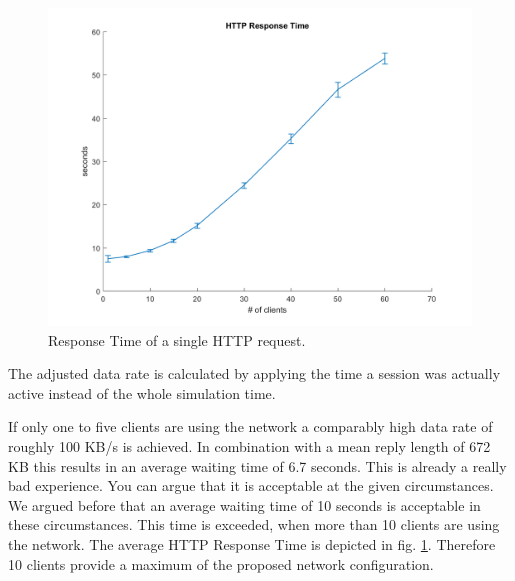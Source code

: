\documentclass[
10pt, %
a4paper, %
oneside, %
headinclude,footinclude, %
BCOR5mm, %
]{scrartcl}
\begin{document}
\begin{figure}[!ht]
  \centering
  \includegraphics[width=\textwidth]{Figures/cctv/HTTP_Response_Time.png}
  \caption{Response Time of a single HTTP request.} \label{fig:cctv_http_request_time}
\end{figure}

The adjusted data rate is calculated by applying the time a session was actually active instead of the whole simulation time. 

If only one to five clients are using the network a comparably high data rate of roughly 100 KB/s is achieved. In combination with a mean reply length of 672 KB this results in an average waiting time of 6.7 seconds. This is already a really bad experience. You can argue that it is acceptable at the given circumstances. We argued before that an average waiting time of 10 seconds is acceptable in these circumstances. This time is exceeded, when more than 10 clients are using the network. The average HTTP Response Time is depicted in fig. \ref{fig:cctv_http_request_time}. Therefore 10 clients provide a maximum of the proposed network configuration.
\end{document}
